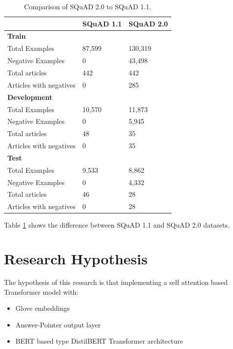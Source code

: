 \documentclass[a4paper,12pt]{report}
\begin{document}
		\begin{table}[h!]
		              \centering
		                \begin{tabular}{|l|l|l|}
		                    \hline
		                     & SQuAD 1.1 &  SQuAD 2.0 \\
		                    \hline
		                    \textbf{Train} & & \\
		                        Total Examples & 87,599 &  130,319 \\
		                        Negative Examples & 0 & 43,498 \\
		                        Total articles & 442 & 442 \\
		                        Articles with negatives & 0 & 285 \\
		                    \hline
		                    \textbf{Development} & & \\
		                        Total Examples & 10,570 &  11,873 \\
		                        Negative Examples & 0 & 5,945 \\
		                        Total articles & 48 & 35 \\
		                        Articles with negatives & 0 & 35 \\
		                    \hline
		                    \textbf{Test} &  & \\
		                        Total Examples & 9,533 & 8,862 \\
		                        Negative Examples & 0 & 4,332 \\
		                        Total articles & 46 & 28 \\
		                        Articles with negatives & 0 & 28 \\
		                    \hline
		                \end{tabular}
		                \caption{Comparison of  SQuAD 2.0 to SQuAD 1.1\citep{dataset}.}\label{datasetDescription}
		 \end{table}

    Table \ref{datasetDescription} shows the difference between SQuAD 1.1 and SQuAD 2.0 datasets.

    \section{Research Hypothesis}\label{c33}
    The hypothesis of this research is that implementing a self attention based Transformer model with:
    \begin{itemize}
    	\item Glove embeddings
    	\item Answer-Pointer output layer\citep{lstmPointer, lstmhu2016question}
    	\item BERT based \citep{bert} type DistilBERT Transformer architecture
    \end{itemize}
\end{document}
